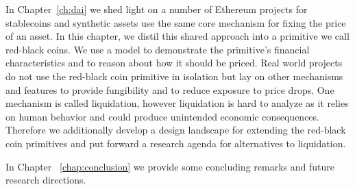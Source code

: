 In Chapter~\ref{ch:dai} we shed light on a number of Ethereum projects for stablecoins and synthetic assets use the same core mechanism for fixing the price of an asset. In this chapter, we distil this shared approach into a primitive we call red-black coins. We use a model to demonstrate the primitive's financial characteristics and to reason about how it should be priced. Real world projects do not use the red-black coin primitive in isolation but lay on other mechanisms and features to provide fungibility and to reduce exposure to price drops. One mechanism is called liquidation, however liquidation is hard to analyze as it relies on human behavior and could produce unintended economic consequences. Therefore we additionally develop a design landscape for extending the red-black coin primitives and put forward a research agenda for alternatives to liquidation.

In Chapter ~\ref{chap:conclusion} we provide some concluding remarks and future research directions.



%
%
%
